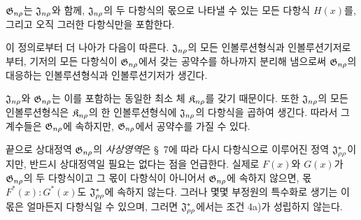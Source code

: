 $\mathfrak G_{n\rho}$는 $\mathfrak J_{n\rho}$와 함께, $\mathfrak J_{n\rho}$의 두 다항식의 몫으로 나타낼 수 있는 모든 다항식 $H(x)$를, 그리고 오직 그러한 다항식만을 포함한다.

이 정의로부터 더 나아가 다음이 따른다. $\mathfrak J_{n\rho}$의 모든 인볼루션형식과 인볼루션기저로부터, 기저의 모든 다항식이 $\mathfrak G_{n\rho}$에서 갖는 공약수를 하나까지 분리해 냄으로써 $\mathfrak G_{n\rho}$의 대응하는 인볼루션형식과 인볼루션기저가 생긴다.

$\mathfrak J_{n\rho}$와 $\mathfrak G_{n\rho}$는 이를 포함하는 동일한 최소 체 $\mathfrak K_{n\rho}$를 갖기 때문이다. 또한 $\mathfrak J_{n\rho}$의 모든 인볼루션형식은 $\mathfrak K_{n\rho}$의 한 인볼루션형식에 $\mathfrak J_{n\rho}$의 다항식을 곱하여 생긴다. 따라서 그 계수들은 $\mathfrak G_{n\rho}$에 속하지만, $\mathfrak G_{n\rho}$에서 공약수를 가질 수 있다.

끝으로 상대정역 $\mathfrak G_{n\rho}$의 \emph{사상영역}은 \S\ 7에 따라 다시 다항식으로 이루어진 정역 $\mathfrak J^*_{\rho\rho}$이지만, 반드시 상대정역일 필요는 없다는 점을 언급한다. 실제로 $F(x)$와 $G(x)$가 $\mathfrak G_{n\rho}$의 두 다항식이고 그 몫이 다항식이 아니어서 $\mathfrak G_{n\rho}$에 속하지 않으면, 몫 $F^*(x):G^*(x)$도 $\mathfrak J^*_{\rho\rho}$에 속하지 않는다. 그러나 몇몇 부정원의 특수화로 생기는 이 몫은 얼마든지 다항식일 수 있으며, 그러면 $\mathfrak J^*_{\rho\rho}$에서는 조건 4a)가 성립하지 않는다.

